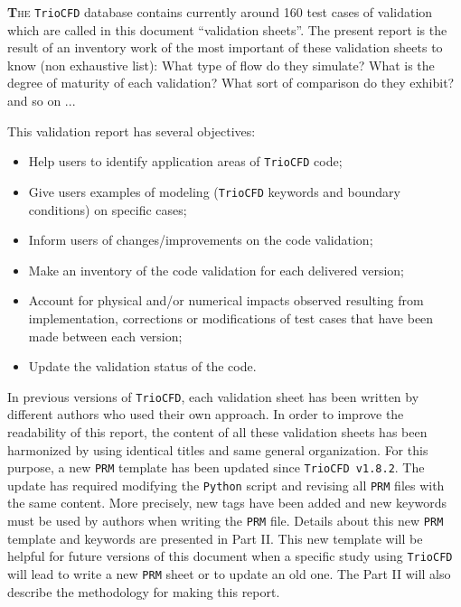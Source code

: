 \lettrine[lines=2,slope=0pt,nindent=4pt]{\textbf{T}}{he} \texttt{TrioCFD}
database contains currently around 160 test cases of validation which
are called in this document ``validation sheets''. The present
report is the result of an inventory work of the most important of these validation
sheets to know (non exhaustive list): What type of flow do they simulate?
What is the degree of maturity of each validation? What sort of
comparison do they exhibit? and so on ... \smallskip\newline

This validation report has several objectives:
\begin{itemize}
\item Help users to identify application areas of \texttt{TrioCFD} code;
\item Give users examples of modeling (\texttt{TrioCFD} keywords and boundary
conditions) on specific cases;
\item Inform users of changes/improvements on the code validation;
\item Make an inventory of the code validation for each delivered version;
\item Account for physical and/or numerical impacts observed resulting from
implementation, corrections or modifications of test cases that have
been made between each version;
\item Update the validation status of the code.
\end{itemize}

In previous versions of \texttt{TrioCFD}, each validation sheet has
been written by different authors who used their own approach. In order
to improve the readability of this report, the content of all these validation
sheets has been harmonized by using identical titles and same general
organization. For this purpose, a new \texttt{PRM} template has been
updated since \texttt{TrioCFD v1.8.2}. The update has required
modifying the \texttt{Python} script and revising all \texttt{PRM}
files with the same content. More precisely, new tags have been added
and new keywords must be used by authors when writing the \texttt{PRM}
file. Details about this new \texttt{PRM} template and keywords are presented
in Part II. This new template will be helpful for future versions
of this document when a specific study using \texttt{TrioCFD} will
lead to write a new \texttt{PRM} sheet or to update an old one. The Part II
will also describe the methodology for making this report.\smallskip\newline

